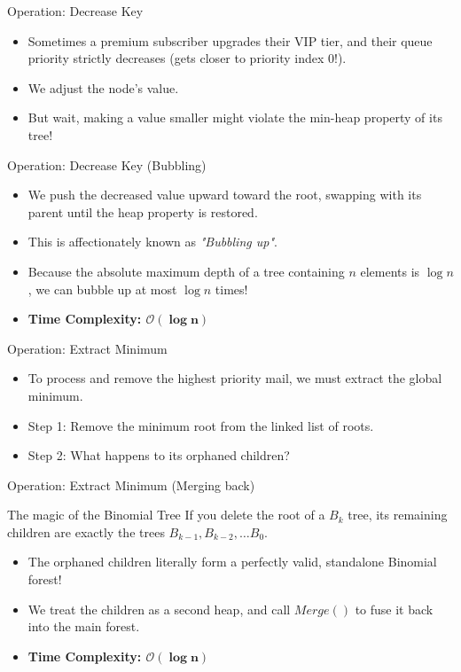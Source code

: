 \documentclass[11pt, aspectratio=169]{beamer}
\begin{document}
\begin{frame}{Operation: Decrease Key}
    \begin{itemize}
        \item Sometimes a premium subscriber upgrades their VIP tier, and their queue priority strictly decreases (gets closer to priority index 0!).
        \item We adjust the node's value.
        \item But wait, making a value smaller might violate the min-heap property of its tree!
    \end{itemize}
\end{frame}

\begin{frame}{Operation: Decrease Key (Bubbling)}
    \begin{itemize}
        \item We push the decreased value upward toward the root, swapping with its parent until the heap property is restored.
        \item This is affectionately known as \textit{"Bubbling up"}.
        \item Because the absolute maximum depth of a tree containing $n$ elements is $\log n$, we can bubble up at most $\log n$ times!
        \item \textbf{Time Complexity: $\mathbf{\mathcal{O}(\log n)}$}
    \end{itemize}
\end{frame}

\begin{frame}{Operation: Extract Minimum}
    \begin{itemize}
        \item To process and remove the highest priority mail, we must extract the global minimum.
        \item Step 1: Remove the minimum root from the linked list of roots.
        \item Step 2: What happens to its orphaned children?
    \end{itemize}
\end{frame}

\begin{frame}{Operation: Extract Minimum (Merging back)}
    \begin{alertblock}{The magic of the Binomial Tree}
        If you delete the root of a $B_k$ tree, its remaining children are exactly the trees $B_{k-1}, B_{k-2}, \dots B_0$.
    \end{alertblock}
    \vspace{0.5cm}
    \begin{itemize}
        \item The orphaned children literally form a perfectly valid, standalone Binomial forest!
        \item We treat the children as a second heap, and call $Merge()$ to fuse it back into the main forest.
        \item \textbf{Time Complexity: $\mathbf{\mathcal{O}(\log n)}$}
    \end{itemize}
\end{frame}
\end{document}
